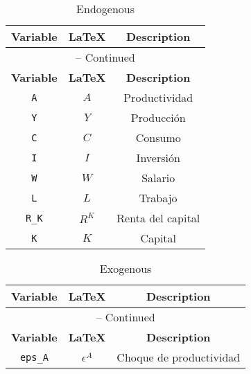 \begin{center}
\begin{longtable}{ccc}
\caption{Endogenous}\\%
\hline%
\multicolumn{1}{c}{\textbf{Variable}} &
\multicolumn{1}{c}{\textbf{\LaTeX}} &
\multicolumn{1}{c}{\textbf{Description}}\\%
\hline\hline%
\endfirsthead
\multicolumn{3}{c}{{\tablename} \thetable{} -- Continued}\\%
\hline%
\multicolumn{1}{c}{\textbf{Variable}} &
\multicolumn{1}{c}{\textbf{\LaTeX}} &
\multicolumn{1}{c}{\textbf{Description}}\\%
\hline\hline%
\endhead
\texttt{A} & $A$ & Productividad\\
\texttt{Y} & $Y$ & Producción\\
\texttt{C} & $C$ & Consumo\\
\texttt{I} & $I$ & Inversión\\
\texttt{W} & $W$ & Salario\\
\texttt{L} & $L$ & Trabajo\\
\texttt{R\_K} & $R^{K}$ & Renta del capital\\
\texttt{K} & $K$ & Capital\\
\hline%
\end{longtable}
\end{center}
\begin{center}
\begin{longtable}{ccc}
\caption{Exogenous}\\%
\hline%
\multicolumn{1}{c}{\textbf{Variable}} &
\multicolumn{1}{c}{\textbf{\LaTeX}} &
\multicolumn{1}{c}{\textbf{Description}}\\%
\hline\hline%
\endfirsthead
\multicolumn{3}{c}{{\tablename} \thetable{} -- Continued}\\%
\hline%
\multicolumn{1}{c}{\textbf{Variable}} &
\multicolumn{1}{c}{\textbf{\LaTeX}} &
\multicolumn{1}{c}{\textbf{Description}}\\%
\hline\hline%
\endhead
\texttt{eps\_A} & $\epsilon^{A}$ & Choque de productividad\\
\hline%
\end{longtable}
\end{center}
